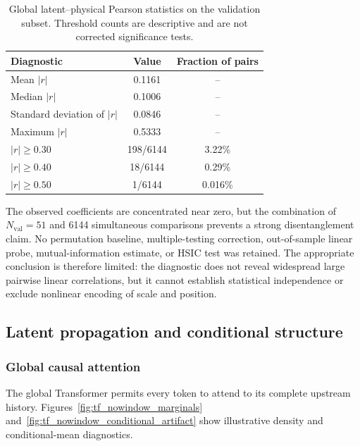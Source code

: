 \begin{table}[H]
    \centering
    \caption{Global latent--physical Pearson statistics on the validation subset. Threshold counts are descriptive and are not corrected significance tests.}
    \label{tab:cvae_global_correlation}
    \begin{tabular}{lcc}
        \toprule
        Diagnostic & Value & Fraction of pairs \\
        \midrule
        Mean $|r|$ & 0.1161 & -- \\
        Median $|r|$ & 0.1006 & -- \\
        Standard deviation of $|r|$ & 0.0846 & -- \\
        Maximum $|r|$ & 0.5333 & -- \\
        $|r|\geq0.30$ & 198/6144 & 3.22\% \\
        $|r|\geq0.40$ & 18/6144 & 0.29\% \\
        $|r|\geq0.50$ & 1/6144 & 0.016\% \\
        \bottomrule
    \end{tabular}
\end{table}

The observed coefficients are concentrated near zero, but the combination of $N_{\mathrm{val}}=51$ and 6144 simultaneous comparisons prevents a strong disentanglement claim. No permutation baseline, multiple-testing correction, out-of-sample linear probe, mutual-information estimate, or HSIC test was retained. The appropriate conclusion is therefore limited: the diagnostic does not reveal widespread large pairwise linear correlations, but it cannot establish statistical independence or exclude nonlinear encoding of scale and position.

\subsection{Latent propagation and conditional structure}
\label{subsec:results_transformer_locality}

\subsubsection{Global causal attention}

The global Transformer permits every token to attend to its complete upstream history. Figures~\ref{fig:tf_nowindow_marginals} and~\ref{fig:tf_nowindow_conditional_artifact} show illustrative density and conditional-mean diagnostics.

